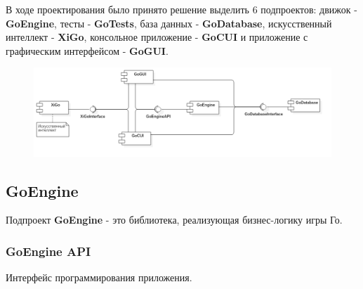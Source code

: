 В ходе проектирования было принято решение выделить 6 подпроектов: движок - \textbf{GoEngine}, тесты - \textbf{GoTests}, база данных - \textbf{GoDatabase}, 
искусственный интеллект - \textbf{XiGo}, консольное приложение - \textbf{GoCUI} и приложение с графическим интерфейсом - \textbf{GoGUI}. 

\begin{figure}[H]
	\begin{center}
		\includegraphics[scale=0.49]{../UMLdiagrams/Component/Component.png}
		\label{pic:Component}
	\end{center}
\end{figure}

\subsection*{GoEngine}

Подпроект \textbf{GoEngine} - это библиотека, реализующая бизнес-логику игры Го.

\subsubsection*{GoEngine API}

Интерфейс программирования приложения.\\

